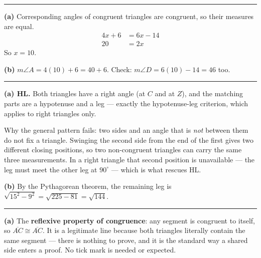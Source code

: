 \documentclass[12pt]{article}
\begin{document}
\vspace{0.2cm}\noindent\rule{\linewidth}{0.2pt}


\textbf{(a)} Corresponding angles of congruent triangles are congruent, so their measures are equal.
\begin{align*}
  4x + 6 &= 6x - 14 \\
  20 &= 2x
\end{align*}
So $x = 10$. 

\textbf{(b)} $m\angle A = 4(10) + 6 = 40 + 6$. Check: $m\angle D = 6(10) - 14 = 46$ too. 

\vspace{0.2cm}\noindent\rule{\linewidth}{0.2pt}


\textbf{(a) HL.} Both triangles have a right angle (at $C$ and at $Z$), and the matching parts are a hypotenuse and a leg --- exactly the hypotenuse-leg criterion, which applies to right triangles only.

Why the general pattern fails: two sides and an angle that is \emph{not} between them do not fix a triangle. Swinging the second side from the end of the first gives two different closing positions, so two non-congruent triangles can carry the same three measurements. In a right triangle that second position is unavailable --- the leg must meet the other leg at $90^\circ$ --- which is what rescues HL.

\textbf{(b)} By the Pythagorean theorem, the remaining leg is $\sqrt{15^2 - 9^2} = \sqrt{225 - 81} = \sqrt{144}$. 

\vspace{0.2cm}\noindent\rule{\linewidth}{0.2pt}


\textbf{(a)} The \textbf{reflexive property of congruence}: any segment is congruent to itself, so $\overline{AC} \cong \overline{AC}$. It is a legitimate line because both triangles literally contain the same segment --- there is nothing to prove, and it is the standard way a shared side enters a proof. No tick mark is needed or expected.
\end{document}
